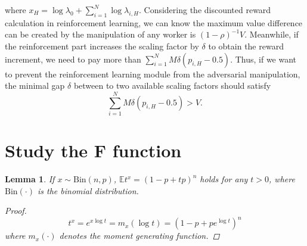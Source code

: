 \documentclass{article}
\newtheorem{lemma}[theorem]{Lemma}
\begin{document}
where $x_H= \log\lambda_0 + {\sum}_{i=1}^{N}\log\lambda_{i,H}$.
Considering the discounted reward calculation in reinforcement learning, we can know the maximum value difference can be created by the manipulation of any worker is $(1-\rho)^{-1}V$. Meanwhile, if the reinforcement part increases the scaling factor by $\delta$ to obtain the reward increment, we need to pay more than $\sum_{i=1}^{N}M\delta (p_{i,H}-0.5)$. Thus, if we want to prevent the reinforcement learning module from the adversarial manipulation, the minimal gap $\delta$ between to two available scaling factors should satisfy
\begin{equation}
    \sum_{i=1}^{N}M\delta (p_{i,H}-0.5) > V.
\end{equation}

\section{Study the F function}
\begin{lemma}
If $x\sim \mathrm{Bin}(n,p)$, $\mathbb{E}t^x= \left(1-p+tp\right)^{n}$ holds for any $t>0$, where $\mathrm{Bin}(\cdot)$ is the binomial distribution.
\begin{proof}
\begin{equation*}
t^x = e^{x\log t}=m_x(\log t)= \left(1-p+pe^{\log t}\right)^{n}
\end{equation*}
where $m_x(\cdot)$ denotes the moment generating function.
\end{proof}
\end{lemma}
\end{document}
